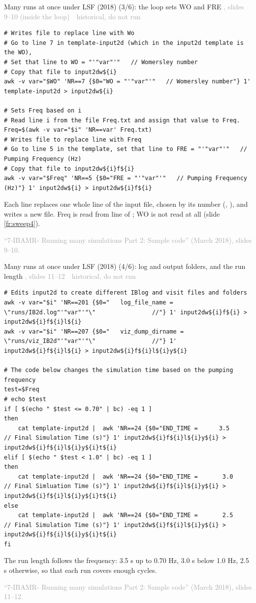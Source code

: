 \documentclass[aspectratio=169,11pt]{beamer}
\newcommand{\sourcecredit}[1]{\vfill\begin{flushright}\tiny\textcolor{DarkGray}{#1}\end{flushright}}
\newcommand{\hist}[1]{{\tiny\sffamily\textcolor{DarkGray}{#1\ \textbullet\ historical, do not run}}\par\nointerlineskip\vspace{0.3mm}}
\begin{document}
\begin{frame}[fragile]{Many runs at once under LSF (2018) (3/6): the loop sets WO and FRE}
\label{fr:sweep2b}
\hist{, slides 9--10 (inside the loop)}
\begin{lstlisting}[style=hist]
# Writes file to replace line with Wo
# Go to line 7 in template-input2d (which in the input2d template is the WO),
# Set that line to WO = "'"var"'"   // Womersley number
# Copy that file to input2dw${i}
awk -v var="$WO" 'NR==7 {$0="WO = "'"var"'"   // Womersley number"} 1' template-input2d > input2dw${i}

# Sets Freq based on i
# Read line i from the file Freq.txt and assign that value to Freq.
Freq=$(awk -v var="$i" 'NR==var' Freq.txt)
# Writes file to replace line with Freq
# Go to line 5 in the template, set that line to FRE = "'"var"'"   // Pumping Frequency (Hz)
# Copy that file to input2dw${i}f${i}
awk -v var="$Freq" 'NR==5 {$0="FRE = "'"var"'"   // Pumping Frequency (Hz)"} 1' input2dw${i} > input2dw${i}f${i}
\end{lstlisting}
\footnotesize Each  line replaces one whole line of the input file, chosen by its number (, ), and writes a new file. Freq is read from line  of ; WO is not read at all (slide \ref{fr:sweep4}).
\sourcecredit{``7-IBAMR- Running many simulations Part 2: Sample code'' (March 2018), slides 9--10.}
\end{frame}

\begin{frame}[fragile]{Many runs at once under LSF (2018) (4/6): log and output folders, and the run length}
\label{fr:sweep3}
\hist{, slides 11--12}
\begin{lstlisting}[style=hist]
# Edits input2d to create different IBlog and visit files and folders
awk -v var="$i" 'NR==201 {$0="   log_file_name = \"runs/IB2d.log"'"var"'"\"                //"} 1' input2dw${i}f${i} > input2dw${i}f${i}l${i}
awk -v var="$i" 'NR==207 {$0="   viz_dump_dirname = \"runs/viz_IB2d"'"var"'"\"                //"} 1' input2dw${i}f${i}l${i} > input2dw${i}f${i}l${i}y${i}

# The code below changes the simulation time based on the pumping frequency
test=$Freq
# echo $test
if [ $(echo " $test <= 0.70" | bc) -eq 1 ]
then
    cat template-input2d |  awk 'NR==24 {$0="END_TIME =      3.5                // Final Simulation Time (s)"} 1' input2dw${i}f${i}l${i}y${i} > input2dw${i}f${i}l${i}y${i}t${i}
elif [ $(echo " $test < 1.0" | bc) -eq 1 ]
then
    cat template-input2d |  awk 'NR==24 {$0="END_TIME =       3.0               // Final Simluation Time (s)"} 1' input2dw${i}f${i}l${i}y${i} > input2dw${i}f${i}l${i}y${i}t${i}
else
    cat template-input2d |  awk 'NR==24 {$0="END_TIME =       2.5                // Final Simulation Time (s)"} 1' input2dw${i}f${i}l${i}y${i} > input2dw${i}f${i}l${i}y${i}t${i}
fi
\end{lstlisting}
\footnotesize The run length follows the frequency: 3.5 s up to 0.70 Hz, 3.0 s below 1.0 Hz, 2.5 s otherwise, so that each run covers enough cycles.
\sourcecredit{``7-IBAMR- Running many simulations Part 2: Sample code'' (March 2018), slides 11--12.}
\end{frame}
\end{document}

